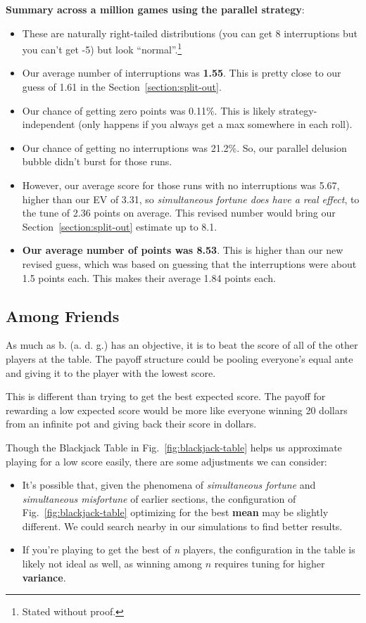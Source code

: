 \documentclass[11pt, oneside]{article} 	%
\begin{document}
\textbf{Summary across a million games using the parallel strategy}:
\begin{itemize}
\item These are naturally right-tailed distributions (you can get 8 interruptions but you can't get -5) but look ``normal''.\footnote{Stated without proof.}
\item Our average number of interruptions was \textbf{1.55}. This is pretty close to our guess of 1.61 in the Section~\ref{section:split-out}.
\item Our chance of getting zero points was 0.11\%. This is likely strategy-independent (only happens if you always get a max somewhere in each roll).
\item Our chance of getting no interruptions was 21.2\%. So, our parallel delusion bubble didn't burst for those runs.
\item However, our average score for those runs with no interruptions was 5.67, higher than our EV of 3.31,  so \emph{simultaneous fortune does have a real effect}, to the tune of 2.36 points on average. This revised number would bring our Section~\ref{section:split-out} estimate up to 8.1.
\item \textbf{Our average number of points was 8.53}. This is higher than our new revised guess, which was based on guessing that the interruptions were about 1.5 points each. This makes their average 1.84 points each.
\end{itemize}

\subsection{Among Friends}

As much as b. (a. d. g.) has an objective, it is to beat the score of all of the other players at the table. The payoff structure could be pooling everyone's equal ante and giving it to the player with the lowest score.

This is different than trying to get the best expected score. The payoff for rewarding a low expected score would be more like everyone winning 20 dollars from an infinite pot and giving back their score in dollars.

Though the Blackjack Table in Fig.~\ref{fig:blackjack-table} helps us approximate playing for a low score easily, there are some adjustments we can consider:
\begin{itemize}
\item It's possible that, given the phenomena of \emph{simultaneous fortune} and \emph{simultaneous misfortune} of earlier sections, the configuration of Fig.~\ref{fig:blackjack-table} optimizing for the best \textbf{mean} may be slightly different. We could search nearby in our simulations to find better results.
\item If you're playing to get the best of \emph{n} players, the configuration in the table is likely not ideal as well, as winning among $n$ requires tuning for higher \textbf{variance}.
\end{itemize}
\end{document}
